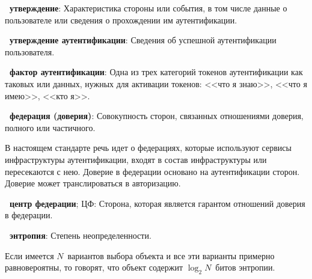 

{\bf \thedefctr~утверждение}:
Характеристика стороны или события, в том числе данные о пользователе или
сведения о прохождении им аутентификации.

{\bf \thedefctr~утверждение аутентификации}:
Сведения об успешной аутентификации пользователя.

{\bf \thedefctr~фактор аутентификации}:
Одна из трех категорий токенов аутентификации как таковых или данных, нужных для
активации токенов: <<что я знаю>>, <<что я имею>>, <<кто я>>.


{\bf \thedefctr~федерация (доверия)}:
Совокупность сторон, связанных отношениями доверия, полного или частичного.

\begin{note*}
В настоящем стандарте речь идет о федерациях, которые используют сервисы
инфраструктуры аутентификации, входят в состав инфраструктуры или пересекаются с
нею.
%
Доверие в федерации основано на аутентификации сторон. Доверие может
транслироваться в авторизацию.
\end{note*}



{\bf \thedefctr~центр федерации}; ЦФ:
Сторона, которая является гарантом отношений доверия в федерации.


{\bf \thedefctr~энтропия}:
Степень неопределенности. 

\begin{note*}
Если имеется $N$~вариантов выбора объекта и все эти варианты примерно
равновероятны, то говорят, что объект содержит $\log_2 N$~битов энтропии.
\end{note*}

